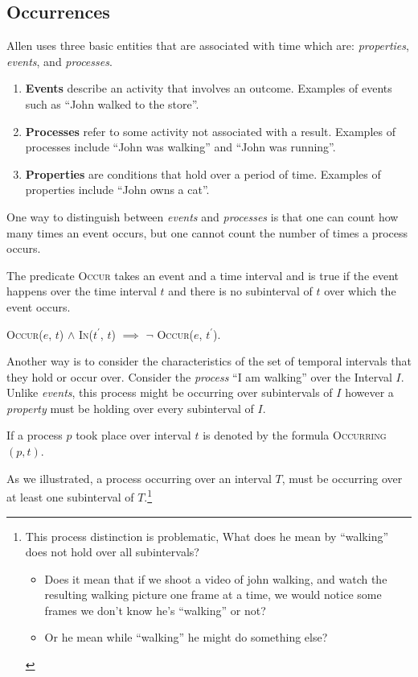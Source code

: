\subsection{Occurrences}
Allen uses three basic entities that are associated with time which are: \textit{properties}, \textit{events}, and \textit{processes}.
\begin{enumerate}
	\item \textbf{Events} describe an activity that involves an outcome. Examples of events such as ``John walked to the store''.

	\item \textbf{Processes} refer to some activity not associated with a result. Examples of processes include ``John was walking'' and ``John was running''.

	\item \textbf{Properties} are conditions that hold over a period of time. Examples of properties include ``John owns a cat''.
\end{enumerate}
One way to distinguish between \textit{events} and \textit{processes} is that one can count how many times an event occurs, but one cannot count
the number of times a process occurs.


The predicate \textsc{Occur} takes an event and a time interval and is true if the event happens over the time interval $t$ and there is no subinterval of $t$
over which the event occurs.

\begin{center}
	\textsc{Occur}($e$, $t$) $\land$ \textsc{In}($t^\prime$, $t$) $\implies$ \(\lnot\) \textsc{Occur}($e$, $t^\prime$).
\end{center}

Another way is to consider the characteristics of the set of temporal intervals that they hold or occur over.
Consider the \textit{process} ``I am walking'' over the Interval $I$. Unlike \textit{events}, this process might be occurring over subintervals of $I$ however a \textit{property} must be holding over every subinterval of $I$.


If a process $p$ took place over interval $t$ is denoted by the formula \textsc{Occurring}$(p,t)$.


As we illustrated, a process occurring over an interval $T$, must be occurring over at least one subinterval of $T$.\footnote{This process distinction is problematic, What does he mean by ``walking'' does not hold over all subintervals?
	\begin{itemize}
		\item
		      Does it mean that if we shoot a video of john walking, and watch the resulting walking picture one frame at a time, we would notice some frames we don't know he's ``walking'' or not?
		\item Or he mean while ``walking'' he might do something else?
	\end{itemize}
}

